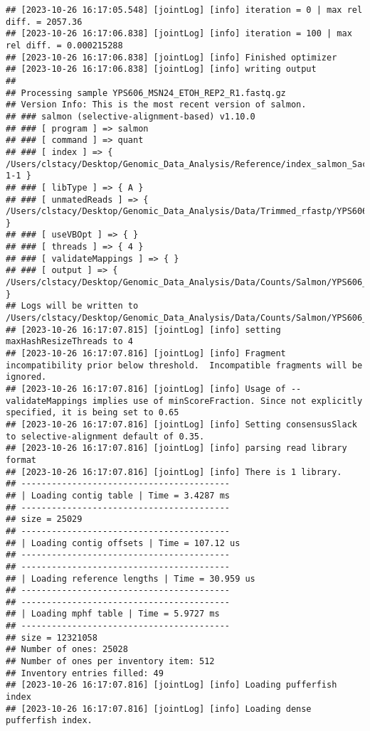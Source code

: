 \documentclass[
]{book}
\begin{document}
\begin{verbatim}
## [2023-10-26 16:17:05.548] [jointLog] [info] iteration = 0 | max rel diff. = 2057.36
## [2023-10-26 16:17:06.838] [jointLog] [info] iteration = 100 | max rel diff. = 0.000215288
## [2023-10-26 16:17:06.838] [jointLog] [info] Finished optimizer
## [2023-10-26 16:17:06.838] [jointLog] [info] writing output 
## 
## Processing sample YPS606_MSN24_ETOH_REP2_R1.fastq.gz
## Version Info: This is the most recent version of salmon.
## ### salmon (selective-alignment-based) v1.10.0
## ### [ program ] => salmon 
## ### [ command ] => quant 
## ### [ index ] => { /Users/clstacy/Desktop/Genomic_Data_Analysis/Reference/index_salmon_Saccharomyces_cerevisiae.R64-1-1 }
## ### [ libType ] => { A }
## ### [ unmatedReads ] => { /Users/clstacy/Desktop/Genomic_Data_Analysis/Data/Trimmed_rfastp/YPS606_MSN24_ETOH_REP2_R1.fastq.gz }
## ### [ useVBOpt ] => { }
## ### [ threads ] => { 4 }
## ### [ validateMappings ] => { }
## ### [ output ] => { /Users/clstacy/Desktop/Genomic_Data_Analysis/Data/Counts/Salmon/YPS606_MSN24_ETOH_REP2_R1.fastq.gz_quant }
## Logs will be written to /Users/clstacy/Desktop/Genomic_Data_Analysis/Data/Counts/Salmon/YPS606_MSN24_ETOH_REP2_R1.fastq.gz_quant/logs
## [2023-10-26 16:17:07.815] [jointLog] [info] setting maxHashResizeThreads to 4
## [2023-10-26 16:17:07.816] [jointLog] [info] Fragment incompatibility prior below threshold.  Incompatible fragments will be ignored.
## [2023-10-26 16:17:07.816] [jointLog] [info] Usage of --validateMappings implies use of minScoreFraction. Since not explicitly specified, it is being set to 0.65
## [2023-10-26 16:17:07.816] [jointLog] [info] Setting consensusSlack to selective-alignment default of 0.35.
## [2023-10-26 16:17:07.816] [jointLog] [info] parsing read library format
## [2023-10-26 16:17:07.816] [jointLog] [info] There is 1 library.
## -----------------------------------------
## | Loading contig table | Time = 3.4287 ms
## -----------------------------------------
## size = 25029
## -----------------------------------------
## | Loading contig offsets | Time = 107.12 us
## -----------------------------------------
## -----------------------------------------
## | Loading reference lengths | Time = 30.959 us
## -----------------------------------------
## -----------------------------------------
## | Loading mphf table | Time = 5.9727 ms
## -----------------------------------------
## size = 12321058
## Number of ones: 25028
## Number of ones per inventory item: 512
## Inventory entries filled: 49
## [2023-10-26 16:17:07.816] [jointLog] [info] Loading pufferfish index
## [2023-10-26 16:17:07.816] [jointLog] [info] Loading dense pufferfish index.

\end{verbatim}
\end{document}
